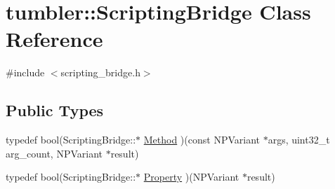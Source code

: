 \hypertarget{classtumbler_1_1_scripting_bridge}{
\section{tumbler::ScriptingBridge Class Reference}
\label{classtumbler_1_1_scripting_bridge}
}


{\ttfamily \#include $<$scripting\_\-bridge.h$>$}

\subsection*{Public Types}
\begin{DoxyCompactItemize}
\item 
typedef bool(ScriptingBridge::$\ast$ \hyperlink{classtumbler_1_1_scripting_bridge_addb1badb0e891b38c6d90767342b5bb3}{Method} )(const NPVariant $\ast$args, uint32\_\-t arg\_\-count, NPVariant $\ast$result)
\item 
typedef bool(ScriptingBridge::$\ast$ \hyperlink{classtumbler_1_1_scripting_bridge_ad7507ce0e5c8f49fde790c743447f3c3}{Property} )(NPVariant $\ast$result)
\end{DoxyCompactItemize}
